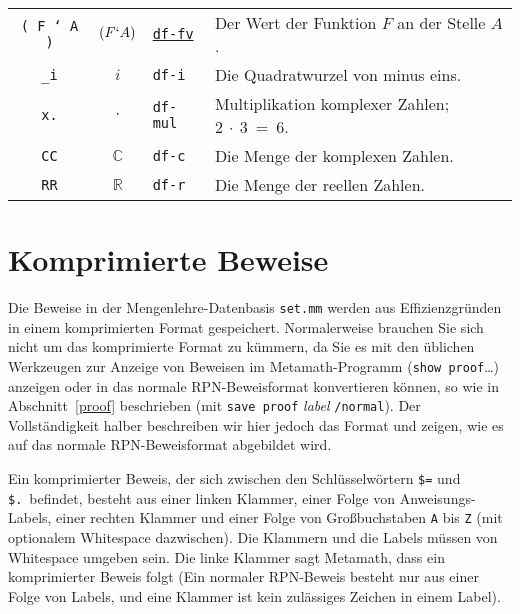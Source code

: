 {\begin{longtabu}   { @{} c c l X }
\texttt{( F ` A )} & $ ( F ` A ) $ &
\hyperref[df-fv]{\texttt{df-fv}} &
Der Wert der Funktion $F$ an der Stelle $A$. \\
\texttt{\_i} & $ i $ &
\texttt{df-i} &
Die Quadratwurzel von minus eins. \\
\texttt{x.} & $ \cdot $ &
\texttt{df-mul} &
Multiplikation komplexer Zahlen; $2~\cdot~3~=~6$. \\
\texttt{CC} & $ \mathbb{C} $ &
\texttt{df-c} &
Die Menge der komplexen Zahlen. \\
\texttt{RR} & $ \mathbb{R} $ &
\texttt{df-r} &
Die Menge der reellen Zahlen. \\
\end{longtabu}
} %

\chapter{Komprimierte Beweise}
\label{compressed}

Die Beweise in der Mengenlehre-Datenbasis \texttt{set.mm} werden aus Effizienzgründen in einem komprimierten Format gespeichert.  Normalerweise brau\-chen Sie sich nicht um das komprimierte Format zu kümmern, da Sie es mit den üblichen Werkzeugen zur Anzeige von Beweisen im Metamath-Programm (\texttt{show proof}\ldots) anzeigen oder in das normale RPN-Beweisformat konvertieren können, so wie in Abschnitt~\ref{proof} beschrieben (mit \texttt{save proof} {\em label} \texttt{/normal}).  Der Vollständigkeit halber beschreiben wir hier jedoch das Format und zeigen, wie es auf das normale RPN-Beweisformat abgebildet wird. 

Ein komprimierter Beweis, der sich zwischen den Schlüsselwörtern \texttt{\$=} und \texttt{\$.}\ befindet, besteht aus einer linken Klammer, einer Folge von Anweisungs-Labels, einer rechten Klammer und einer Folge von Großbuchstaben \texttt{A} bis \texttt{Z} (mit optionalem Whitespace dazwischen).  Die Klammern und die Labels müssen von Whitespace umgeben sein.  Die linke Klammer sagt Metamath, dass ein komprimierter Beweis folgt (Ein normaler RPN-Beweis besteht nur aus einer Folge von Labels, und eine Klammer ist kein zulässiges Zeichen in einem Label).

